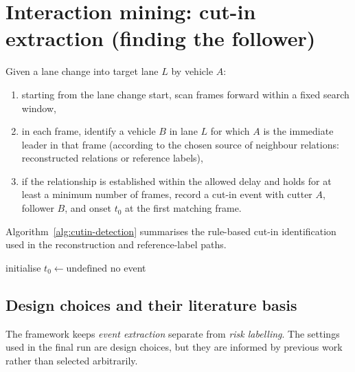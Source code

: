 \documentclass[12pt,a4paper,twoside,openright]{report}
\begin{document}
    \section{Interaction mining: cut-in extraction (finding the follower)}
    Given a lane change into target lane $L$ by vehicle $A$:
    \begin{enumerate}[leftmargin=1.6em]
  \item starting from the lane change start, scan frames forward within a fixed search window,
  \item in each frame, identify a vehicle $B$ in lane $L$ for which $A$ is the immediate leader in that frame (according to the chosen source of neighbour relations: reconstructed relations or reference labels),
  \item if the relationship is established within the allowed delay and holds for at least a minimum number of frames, record a cut-in event with cutter $A$, follower $B$, and onset $t_0$ at the first matching frame.
    \end{enumerate}

    Algorithm~\ref{alg:cutin-detection} summarises the rule-based cut-in identification used in the reconstruction and reference-label paths.

    \begin{algorithm}[t]
\caption{Cut-in identification as a cutter--follower pair}
\label{alg:cutin-detection}

initialise $t_0 \leftarrow \text{undefined}$\;
\Return no event\;
    \end{algorithm}

    \subsection{Design choices and their literature basis}
    The framework keeps \emph{event extraction} separate from \emph{risk labelling}. The settings used in the final run are design choices, but they are informed by previous work rather than selected arbitrarily.
\end{document}
